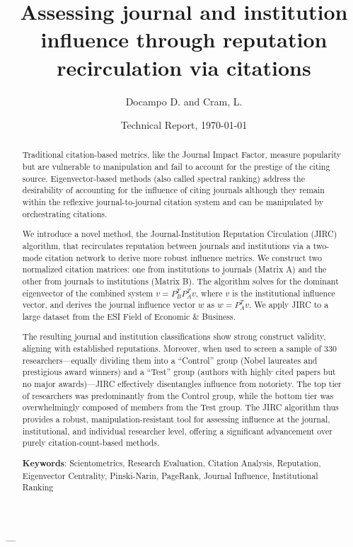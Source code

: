 \documentclass[10pt]{article}
\title{Assessing journal and institution influence through reputation recirculation via citations}
\date{Technical Report, \today}
\author{Docampo D. and Cram, L.}
\begin{document}
\maketitle

\begin{abstract}

Traditional citation-based metrics, like the Journal Impact Factor, measure popularity but are vulnerable to manipulation and fail to account for the prestige of the citing source. Eigenvector-based methods (also called spectral ranking) address the desirability of accounting for the influence of citing journals although they remain within the reflexive journal-to-journal citation system and can be manipulated by orchestrating citations.

 We introduce a novel method, the Journal-Institution Reputation Circulation (JIRC) algorithm, that recirculates reputation between journals and institutions via a two-mode citation network to derive more robust influence metrics.
We construct two normalized citation matrices: one from institutions to journals (Matrix A) and the other from journals to institutions (Matrix B). The algorithm solves for the dominant eigenvector of the combined system \(v = P_B^T P_A^T v\), where \(v\) is the institutional influence vector, and derives the journal influence vector \(w\) as \(w = P_A^T v\). We apply JIRC to a large dataset from the ESI Field of Economic \& Business.

The resulting journal and institution classifications show strong construct validity, aligning with established reputations. Moreover, when used to screen a sample of 330 researchers—equally dividing them into a ``Control'' group (Nobel laureates and prestigious award winners) and a ``Test'' group (authors with highly cited papers but no major awards)—JIRC effectively disentangles influence from notoriety. The top tier of researchers was predominantly from the Control group, while the bottom tier was overwhelmingly composed of members from the Test group. The JIRC algorithm thus provides a robust, manipulation-resistant tool for assessing influence at the journal, institutional, and individual researcher level, offering a significant advancement over purely citation-count-based methods.

{\bfseries Keywords}: Scientometrics, Research Evaluation, Citation Analysis, Reputation, Eigenvector Centrality, Pinski-Narin, PageRank, Journal Influence, Institutional Ranking
 \end{abstract}
---
\end{document}
